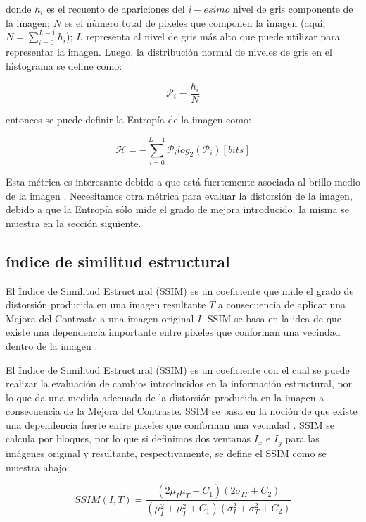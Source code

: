 \documentclass[spanish,twocolumn]{article}
\begin{document}
donde $h_i$ es el recuento de apariciones del $i-esimo$ nivel de gris componente de la imagen; $N$ es el número total de pixeles que componen la imagen (aquí, $N=\sum_{i=0}^{L-1}h_i$); $L$ representa al nivel de gris más alto que puede utilizar para representar la imagen. Luego, la distribución normal de niveles de gris en el histograma se define como:

\begin{equation}\label{eq:distribucionormal}
\mathcal{P}_i=\frac{h_i}{N}
\end{equation}

entonces se puede definir la Entropía de la imagen como:

\begin{equation}\label{eq:entropia}
\mathscr{H}=-\sum_{i=0}^{L-1}\mathcal{P}_i log_2(\mathcal{P}_i) [bits]
\end{equation}

Esta métrica es interesante debido a que está fuertemente asociada al brillo medio de la imagen \cite{108593}. Necesitamos otra métrica para evaluar la distorsión de la imagen, debido a que la Entropía sólo mide el grado de mejora introducido; la misma se muestra en la sección siguiente. 

\subsection{índice de similitud estructural}
\label{ssec:ssim}

El {Índice de Similitud Estructural (SSIM)} \cite{wang2004image} es un coeficiente que mide el grado de distorsión producida en una imagen resultante $T$ a consecuencia de aplicar una Mejora del Contraste a una imagen original $I$. SSIM se basa en la idea de que existe una dependencia importante entre pixeles que conforman una vecindad dentro de la imagen \cite{kwok2013locally}. 

El Índice de Similitud Estructural (SSIM) es un coeficiente con el cual se puede realizar la evaluación de cambios introducidos en la información estructural, por lo que da una medida adecuada de la distorsión producida en la imagen a consecuencia de la Mejora del Contraste. SSIM se basa en la noción de que existe una dependencia fuerte entre pixeles que conforman una vecindad \cite{kwok2013locally}. SSIM se calcula por bloques, por lo que si definimos dos ventanas $I_x$ e $I_y$ para las imágenes original y resultante, respectivamente, se define el SSIM como se muestra abajo:

\begin{equation}\label{eq:ssim}
SSIM(I,T)=\frac{(2\mu_I\mu_T+C_1)(2\sigma_{IT}+C_2)}{(\mu_I^2+\mu_T^2+C_1)(\sigma_I^2+\sigma_T^2+C_2)}
\end{equation}
\end{document}
